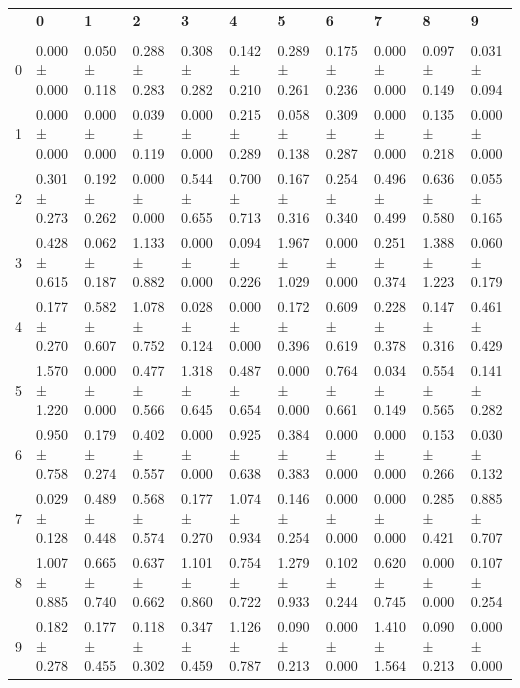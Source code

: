 \begingroup
\scriptsize
\setlength{\tabcolsep}{3pt}
\begin{tabular}{lllllllllll}
\toprule
 & \textbf{0} & \textbf{1} & \textbf{2} & \textbf{3} & \textbf{4} & \textbf{5} & \textbf{6} & \textbf{7} & \textbf{8} & \textbf{9} \\
  &  &  &  &  &  &  &  &  &  &  \\
\midrule
0 & 0.000 ± 0.000 & 0.050 ± 0.118 & 0.288 ± 0.283 & 0.308 ± 0.282 & 0.142 ± 0.210 & 0.289 ± 0.261 & 0.175 ± 0.236 & 0.000 ± 0.000 & 0.097 ± 0.149 & 0.031 ± 0.094 \\
1 & 0.000 ± 0.000 & 0.000 ± 0.000 & 0.039 ± 0.119 & 0.000 ± 0.000 & 0.215 ± 0.289 & 0.058 ± 0.138 & 0.309 ± 0.287 & 0.000 ± 0.000 & 0.135 ± 0.218 & 0.000 ± 0.000 \\
2 & 0.301 ± 0.273 & 0.192 ± 0.262 & 0.000 ± 0.000 & 0.544 ± 0.655 & 0.700 ± 0.713 & 0.167 ± 0.316 & 0.254 ± 0.340 & 0.496 ± 0.499 & 0.636 ± 0.580 & 0.055 ± 0.165 \\
3 & 0.428 ± 0.615 & 0.062 ± 0.187 & 1.133 ± 0.882 & 0.000 ± 0.000 & 0.094 ± 0.226 & 1.967 ± 1.029 & 0.000 ± 0.000 & 0.251 ± 0.374 & 1.388 ± 1.223 & 0.060 ± 0.179 \\
4 & 0.177 ± 0.270 & 0.582 ± 0.607 & 1.078 ± 0.752 & 0.028 ± 0.124 & 0.000 ± 0.000 & 0.172 ± 0.396 & 0.609 ± 0.619 & 0.228 ± 0.378 & 0.147 ± 0.316 & 0.461 ± 0.429 \\
5 & 1.570 ± 1.220 & 0.000 ± 0.000 & 0.477 ± 0.566 & 1.318 ± 0.645 & 0.487 ± 0.654 & 0.000 ± 0.000 & 0.764 ± 0.661 & 0.034 ± 0.149 & 0.554 ± 0.565 & 0.141 ± 0.282 \\
6 & 0.950 ± 0.758 & 0.179 ± 0.274 & 0.402 ± 0.557 & 0.000 ± 0.000 & 0.925 ± 0.638 & 0.384 ± 0.383 & 0.000 ± 0.000 & 0.000 ± 0.000 & 0.153 ± 0.266 & 0.030 ± 0.132 \\
7 & 0.029 ± 0.128 & 0.489 ± 0.448 & 0.568 ± 0.574 & 0.177 ± 0.270 & 1.074 ± 0.934 & 0.146 ± 0.254 & 0.000 ± 0.000 & 0.000 ± 0.000 & 0.285 ± 0.421 & 0.885 ± 0.707 \\
8 & 1.007 ± 0.885 & 0.665 ± 0.740 & 0.637 ± 0.662 & 1.101 ± 0.860 & 0.754 ± 0.722 & 1.279 ± 0.933 & 0.102 ± 0.244 & 0.620 ± 0.745 & 0.000 ± 0.000 & 0.107 ± 0.254 \\
9 & 0.182 ± 0.278 & 0.177 ± 0.455 & 0.118 ± 0.302 & 0.347 ± 0.459 & 1.126 ± 0.787 & 0.090 ± 0.213 & 0.000 ± 0.000 & 1.410 ± 1.564 & 0.090 ± 0.213 & 0.000 ± 0.000 \\
\bottomrule
\end{tabular}

\endgroup
